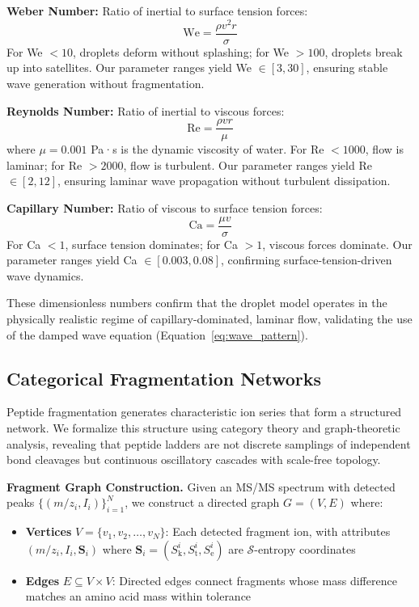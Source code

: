 \documentclass[11pt,twocolumn]{article}
\newcommand{\sentropy}{$\mathcal{S}$-entropy}
\newcommand{\Sk}{S_{\text{k}}}
\newcommand{\St}{S_{\text{t}}}
\newcommand{\Se}{S_{\text{e}}}
\newcommand{\msms}{MS/MS}
\begin{document}
\textbf{Weber Number:} Ratio of inertial to surface tension forces:
\begin{equation}
    \text{We} = \frac{\rho v^2 r}{\sigma}
\end{equation}
For We $< 10$, droplets deform without splashing; for We $> 100$, droplets break up into satellites. Our parameter ranges yield We $\in [3, 30]$, ensuring stable wave generation without fragmentation.

\textbf{Reynolds Number:} Ratio of inertial to viscous forces:
\begin{equation}
    \text{Re} = \frac{\rho v r}{\mu}
\end{equation}
where $\mu = 0.001$ Pa·s is the dynamic viscosity of water. For Re $< 1000$, flow is laminar; for Re $> 2000$, flow is turbulent. Our parameter ranges yield Re $\in [2, 12]$, ensuring laminar wave propagation without turbulent dissipation.

\textbf{Capillary Number:} Ratio of viscous to surface tension forces:
\begin{equation}
    \text{Ca} = \frac{\mu v}{\sigma}
\end{equation}
For Ca $< 1$, surface tension dominates; for Ca $> 1$, viscous forces dominate. Our parameter ranges yield Ca $\in [0.003, 0.08]$, confirming surface-tension-driven wave dynamics.

These dimensionless numbers confirm that the droplet model operates in the physically realistic regime of capillary-dominated, laminar flow, validating the use of the damped wave equation (Equation~\ref{eq:wave_pattern}).

\subsection{Categorical Fragmentation Networks}

Peptide fragmentation generates characteristic ion series that form a structured network. We formalize this structure using category theory and graph-theoretic analysis, revealing that peptide ladders are not discrete samplings of independent bond cleavages but continuous oscillatory cascades with scale-free topology.

\textbf{Fragment Graph Construction.} Given an \msms{} spectrum with detected peaks $\{(m/z_i, I_i)\}_{i=1}^N$, we construct a directed graph $G = (V, E)$ where:
\begin{itemize}[leftmargin=*]
    \item \textbf{Vertices} $V = \{v_1, v_2, \ldots, v_N\}$: Each detected fragment ion, with attributes $(m/z_i, I_i, \mathbf{S}_i)$ where $\mathbf{S}_i = (\Sk^i, \St^i, \Se^i)$ are \sentropy{} coordinates
    \item \textbf{Edges} $E \subseteq V \times V$: Directed edges connect fragments whose mass difference matches an amino acid mass within tolerance
\end{itemize}
\end{document}
